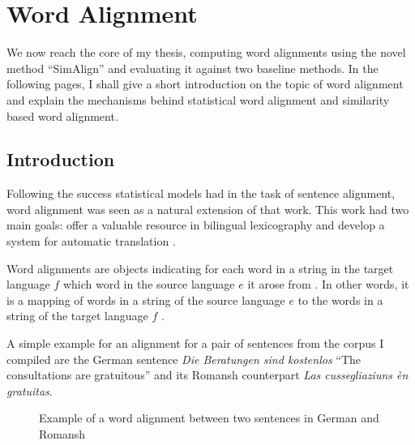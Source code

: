 \chapter{Word Alignment}\label{chap:word-alignment}
We now reach the core of my thesis, computing word alignments using the novel method \enquote{SimAlign} \autocite{jalili-sabet-etal-2020-simalign} and evaluating it against two baseline methods. 
In the following pages, I shall give a short introduction on the topic of word alignment and explain the mechanisms behind statistical word alignment and  similarity based word alignment.

\section{Introduction}
Following the success statistical models had in the task of sentence alignment, word alignment was seen as a natural extension of that work. 
This work had two main goals: offer a valuable resource in bilingual lexicography and develop a system for automatic translation \autocite{brown-etal-1993-mathematics}. 

Word alignments are objects indicating for each word in a string in the target language \(f\) which word in the source language \(e\) it arose from \autocite{brown-etal-1993-mathematics}. 
In other words, it is a mapping of words in a string of the source language \(e\) to the words in a string of the target language \(f\) \autocite[84]{koehn2009}.

A simple example for an alignment for a pair of sentences from the corpus I compiled are the German sentence \emph{Die Beratungen sind kostenlos} \enquote{The consultations are gratuitous} and its Romansh counterpart \emph{Las cussegliaziuns èn gratuitas}. 


\begin{figure}[h]
\centering

    

\vspace*{1cm}

   
\caption[Word alignment example]{Example of a word alignment between two sentences in German and Romansh}
\end{figure}


